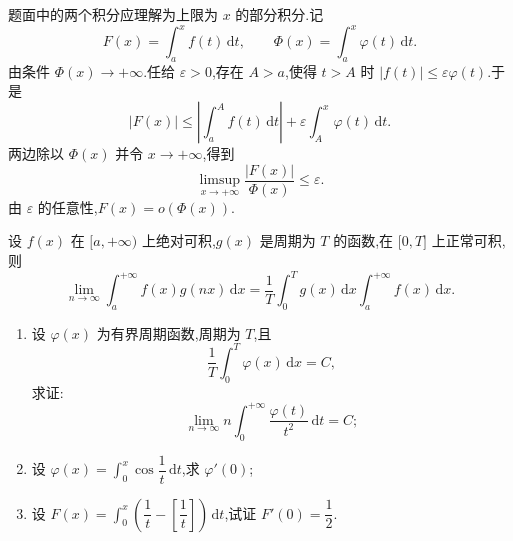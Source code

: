 \begin{solution}
  题面中的两个积分应理解为上限为 $x$ 的部分积分.记
  \[
    F(x)=\int_a^xf(t)\,\mathrm{d}t,
    \qquad
    \Phi(x)=\int_a^x\varphi(t)\,\mathrm{d}t.
  \]
  由条件 $\Phi(x)\to+\infty$.任给 $\varepsilon>0$,存在 $A>a$,使得
  $t>A$ 时 $|f(t)|\leq\varepsilon\varphi(t)$.于是
  \[
    |F(x)|\leq\left|\int_a^Af(t)\,\mathrm{d}t\right|
    +\varepsilon\int_A^x\varphi(t)\,\mathrm{d}t.
  \]
  两边除以 $\Phi(x)$ 并令 $x\to+\infty$,得到
  \[
    \limsup\limits_{x\to+\infty}\dfrac{|F(x)|}{\Phi(x)}\leq\varepsilon.
  \]
  由 $\varepsilon$ 的任意性,$F(x)=o(\Phi(x))$.
\end{solution}

\begin{proposition}
  设 $f(x)$ 在 $\lbrack a,+\infty)$ 上绝对可积,$g(x)$ 是周期为 $T$ 的函数,在 $\lbrack 0,T\rbrack$ 上正常可积,则
  \[
    \lim\limits_{n\to\infty}\int_a^{+\infty}f(x)g(nx)\,\mathrm{d}x
    =\dfrac{1}{T}\int_0^Tg(x)\,\mathrm{d}x\int_a^{+\infty}f(x)\,\mathrm{d}x.
  \]
\end{proposition}

\begin{example}
  \begin{enumerate}
    \item 设 $\varphi(x)$ 为有界周期函数,周期为 $T$,且
          \[
            \dfrac{1}{T}\int_0^T\varphi(x)\,\mathrm{d}x=C,
          \]
          求证:
          \[
            \lim\limits_{n\to\infty}n\int_0^{+\infty}\dfrac{\varphi(t)}{t^2}\,\mathrm{d}t=C;
          \]
    \item 设 $\displaystyle\varphi(x)=\int_0^x\cos\dfrac{1}{t}\,\mathrm{d}t$,求 $\varphi'(0)$;
    \item 设 $\displaystyle F(x)=\int_0^x\left(\dfrac{1}{t}-\left[\dfrac{1}{t}\right]\right)\,\mathrm{d}t$,试证 $F'(0)=\dfrac{1}{2}$.
  \end{enumerate}
\end{example}
\exampleblank

